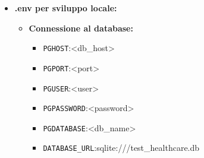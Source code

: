 \documentclass[12pt,a4paper,oneside]{report}
\begin{document}
\begin{itemize}
    \item \textbf{.env per sviluppo locale:}
          \begin{itemize}
              \item \textbf{Connessione al database:}
                    \begin{itemize}
                        \item \texttt{PGHOST}:<db\_host>
                        \item \texttt{PGPORT}:<port>
                        \item \texttt{PGUSER}:<user>
                        \item \texttt{PGPASSWORD}:<password>
                        \item \texttt{PGDATABASE}:<db\_name>
                        \item \texttt{DATABASE\_URL}:sqlite:///test\_healthcare.db
                    \end{itemize}


\end{itemize}
\end{itemize}
\end{document}
